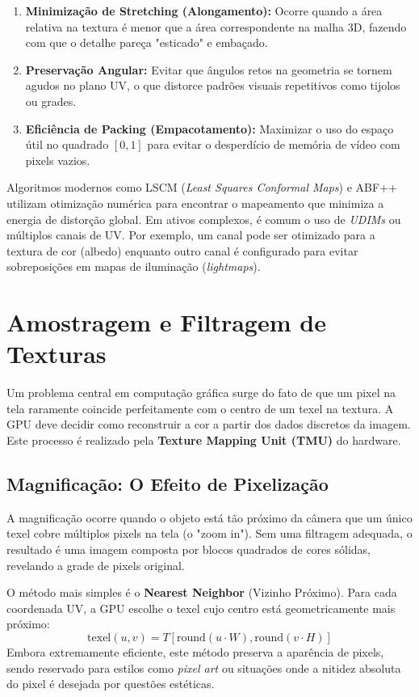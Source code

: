 \begin{enumerate}
    \item \textbf{Minimização de Stretching (Alongamento):} Ocorre quando a área relativa na textura é menor que a área correspondente na malha 3D, fazendo com que o detalhe pareça "esticado" e embaçado.
    \item \textbf{Preservação Angular:} Evitar que ângulos retos na geometria se tornem agudos no plano UV, o que distorce padrões visuais repetitivos como tijolos ou grades.
    \item \textbf{Eficiência de Packing (Empacotamento):} Maximizar o uso do espaço útil no quadrado $[0, 1]$ para evitar o desperdício de memória de vídeo com pixels vazios.
\end{enumerate}

Algoritmos modernos como LSCM (\textit{Least Squares Conformal Maps}) e ABF++ utilizam otimização numérica para encontrar o mapeamento que minimiza a energia de distorção global. 
Em ativos complexos, é comum o uso de \textit{UDIMs} ou múltiplos canais de UV. 
Por exemplo, um canal pode ser otimizado para a textura de cor (albedo) enquanto outro canal é configurado para evitar sobreposições em mapas de iluminação (\textit{lightmaps}).

\section{Amostragem e Filtragem de Texturas}

Um problema central em computação gráfica surge do fato de que um pixel na tela raramente coincide perfeitamente com o centro de um texel na textura. 
A GPU deve decidir como reconstruir a cor a partir dos dados discretos da imagem. 
Este processo é realizado pela \textbf{Texture Mapping Unit (TMU)} do hardware.

\subsection{Magnificação: O Efeito de Pixelização}

A magnificação ocorre quando o objeto está tão próximo da câmera que um único texel cobre múltiplos pixels na tela (o "zoom in"). 
Sem uma filtragem adequada, o resultado é uma imagem composta por blocos quadrados de cores sólidas, revelando a grade de pixels original.

O método mais simples é o \textbf{Nearest Neighbor} (Vizinho Próximo). 
Para cada coordenada UV, a GPU escolhe o texel cujo centro está geometricamente mais próximo:
\[ \text{texel}(u, v) = T[\text{round}(u \cdot W), \text{round}(v \cdot H)] \]
Embora extremamente eficiente, este método preserva a aparência de pixels, sendo reservado para estilos como \textit{pixel art} ou situações onde a nitidez absoluta do pixel é desejada por questões estéticas.

